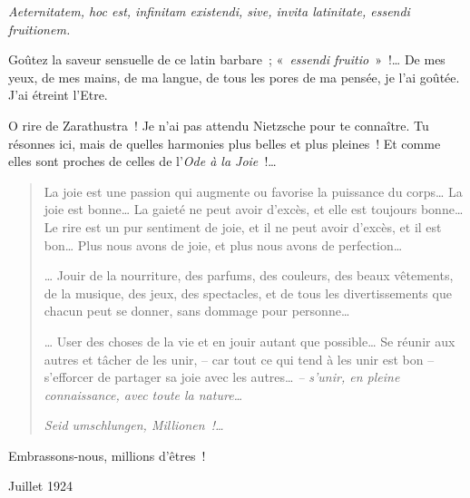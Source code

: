 \emph{Aeternitatem, hoc est, infinitam existendi, sive, invita
latinitate, essendi fruitionem.}

Goûtez la saveur sensuelle de ce latin barbare~; «~\emph{essendi
fruitio}~»~!\ldots{} De mes yeux, de mes mains, de ma langue, de tous les
pores de ma pensée, je l'ai goûtée. J'ai étreint l'Etre.

O rire de Zarathustra~! Je n'ai pas attendu Nietzsche pour te connaître.
Tu résonnes ici, mais de quelles harmonies plus belles et plus pleines~!
Et comme elles sont proches de celles de l'\emph{Ode à la Joie~}!\ldots{}

\begin{quote}
La joie est une passion qui augmente ou favorise la puissance du
corps\ldots{} La joie est bonne\ldots{} La gaieté ne peut avoir d'excès, et elle
est toujours bonne\ldots{} Le rire est un pur sentiment de joie, et il ne
peut avoir d'excès, et il est bon\ldots{} Plus nous avons de joie, et plus
nous avons de perfection\ldots{}

\ldots{} Jouir de la nourriture, des parfums, des couleurs, des beaux
vêtements, de la musique, des jeux, des spectacles, et de tous les
divertissements que chacun peut se donner, sans dommage pour
personne\ldots{}

\ldots{} User des choses de la vie et en jouir autant que possible\ldots{}
Se réunir aux autres et tâcher de les unir, -- car tout ce qui
tend à les unir est bon -- s'efforcer de partager sa joie avec les
autres\ldots{} \emph{-- s'unir, en pleine
connaissance, avec toute la nature\ldots{}}

\emph{Seid umschlungen, Millionen~!\ldots{}}
\end{quote}

Embrassons-nous, millions d'êtres~!

\begin{flushright}
Juillet 1924
\end{flushright}